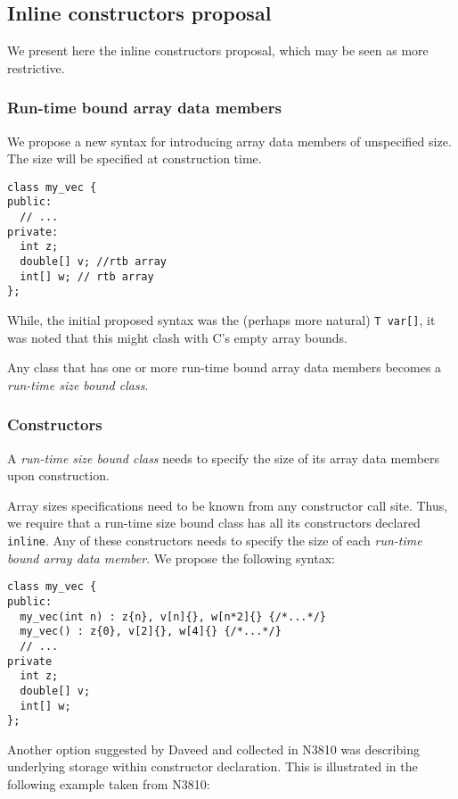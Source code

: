 \subsection{Inline constructors proposal}

We present here the inline constructors proposal, which may be seen as more restrictive.

\subsubsection{Run-time bound array data members}

We propose a new syntax for introducing array data members of unspecified size.
The size will be specified at construction time.

\begin{lstlisting}
class my_vec {
public:
  // ...
private:
  int z;
  double[] v; //rtb array
  int[] w; // rtb array
};
\end{lstlisting}

While, the initial proposed syntax was the (perhaps more natural) 
\verb+T var[]+, it was noted that this might clash with C's empty array bounds.

Any class that has one or more run-time bound array data members becomes a
\emph{run-time size bound class}.

\subsubsection{Constructors}

A \emph{run-time size bound class} needs to specify the size of its array data
members upon construction.

Array sizes specifications need to be known from any constructor call site.
Thus, we require that a run-time size bound class has all its
constructors declared \verb+inline+. Any of these constructors needs  to specify
the size of each \emph{run-time bound array data member}. We propose the
following syntax:

\begin{lstlisting}
class my_vec {
public:
  my_vec(int n) : z{n}, v[n]{}, w[n*2]{} {/*...*/}
  my_vec() : z{0}, v[2]{}, w[4]{} {/*...*/}
  // ...
private
  int z;
  double[] v;
  int[] w;
};
\end{lstlisting}

Another option suggested by Daveed and collected in N3810 was describing
underlying storage within constructor declaration. This is illustrated in the
following example taken from N3810:

